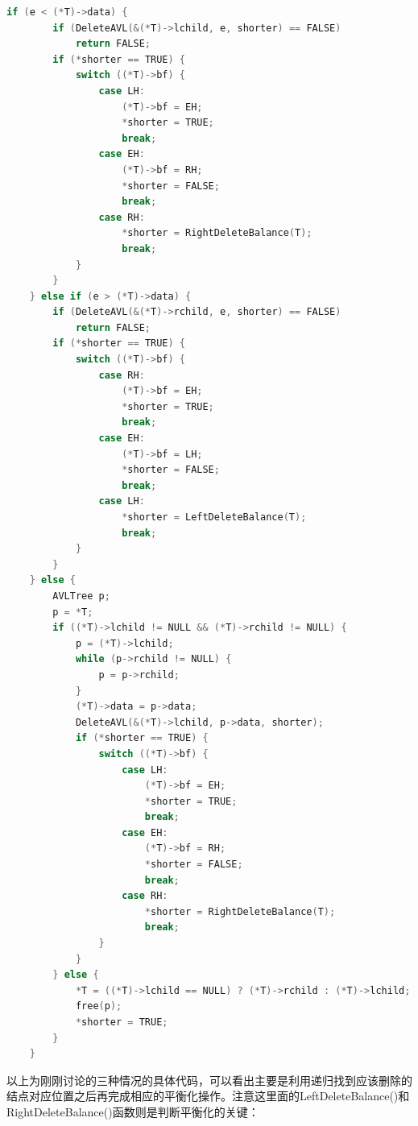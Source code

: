 \begin{lstlisting}[language=C, caption={平衡二叉树的删除}]
    if (e < (*T)->data) {
        if (DeleteAVL(&(*T)->lchild, e, shorter) == FALSE)
            return FALSE;
        if (*shorter == TRUE) {
            switch ((*T)->bf) {
                case LH:
                    (*T)->bf = EH;
                    *shorter = TRUE;
                    break;
                case EH:
                    (*T)->bf = RH;
                    *shorter = FALSE;
                    break;
                case RH:
                    *shorter = RightDeleteBalance(T);
                    break;
            }
        }
    } else if (e > (*T)->data) {
        if (DeleteAVL(&(*T)->rchild, e, shorter) == FALSE)
            return FALSE;
        if (*shorter == TRUE) {
            switch ((*T)->bf) {
                case RH:
                    (*T)->bf = EH;
                    *shorter = TRUE;
                    break;
                case EH:
                    (*T)->bf = LH;
                    *shorter = FALSE;
                    break;
                case LH:
                    *shorter = LeftDeleteBalance(T);
                    break;
            }
        }
    } else {
        AVLTree p;
        p = *T;
        if ((*T)->lchild != NULL && (*T)->rchild != NULL) {
            p = (*T)->lchild;
            while (p->rchild != NULL) {
                p = p->rchild;
            }
            (*T)->data = p->data;
            DeleteAVL(&(*T)->lchild, p->data, shorter);
            if (*shorter == TRUE) {
                switch ((*T)->bf) {
                    case LH:
                        (*T)->bf = EH;
                        *shorter = TRUE;
                        break;
                    case EH:
                        (*T)->bf = RH;
                        *shorter = FALSE;
                        break;
                    case RH:
                        *shorter = RightDeleteBalance(T);
                        break;
                }
            }
        } else {
            *T = ((*T)->lchild == NULL) ? (*T)->rchild : (*T)->lchild;
            free(p);
            *shorter = TRUE;
        }
    }
\end{lstlisting}

以上为刚刚讨论的三种情况的具体代码，可以看出主要是利用递归找到应该删除的结点对应位置之后再完成相应的平衡化操作。注意这里面的LeftDeleteBalance()和RightDeleteBalance()函数则是判断平衡化的关键：


